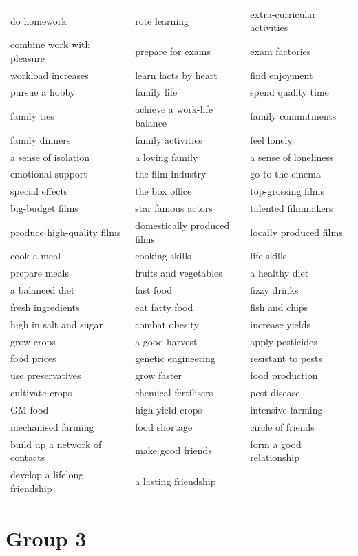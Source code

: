 \documentclass[10pt,a4paper]{article}
\begin{document}
{\begin{longtable}{@{}*{3}{p{}}@{}}
do homework & rote learning & extra-curricular activities \\
combine work with pleasure & prepare for exams & exam factories \\
workload increases & learn facts by heart & find enjoyment \\
pursue a hobby & family life & spend quality time \\
family ties & achieve a work-life balance & family commitments \\
family dinners & family activities & feel lonely \\
a sense of isolation & a loving family & a sense of loneliness \\
emotional support & the film industry & go to the cinema \\
special effects & the box office & top-grossing films \\
big-budget films & star famous actors & talented filmmakers \\
produce high-quality films & domestically produced films & locally produced films \\
cook a meal & cooking skills & life skills \\
prepare meals & fruits and vegetables & a healthy diet \\
a balanced diet & fast food & fizzy drinks \\
fresh ingredients & eat fatty food & fish and chips \\
high in salt and sugar & combat obesity & increase yields \\
grow crops & a good harvest & apply pesticides \\
food prices & genetic engineering & resistant to pests \\
use preservatives & grow faster & food production \\
cultivate crops & chemical fertilisers & pest disease \\
GM food & high-yield crops & intensive farming \\
mechanised farming & food shortage & circle of friends \\
build up a network of contacts & make good friends & form a good relationship \\
develop a lifelong friendship & a lasting friendship &  \\
\end{longtable}}

\section*{Group 3}
\end{document}
